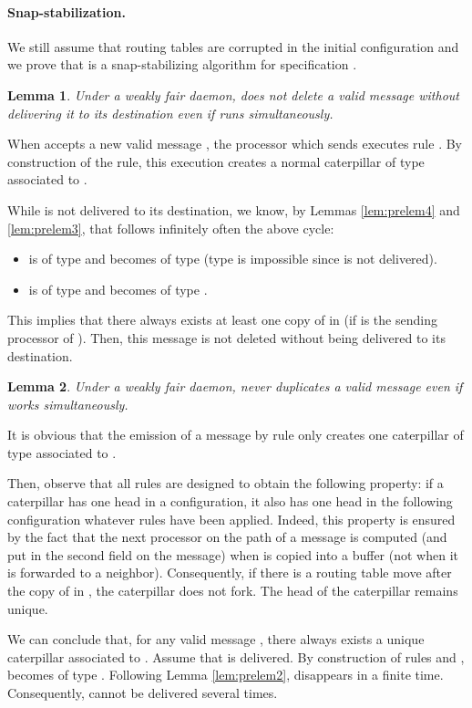 \documentclass[11pt]{article}
\newtheorem{lemma}{Lemma}
\newenvironment{proof}{{\noindent\bf Proof. } }{{\hfill }}
\begin{document}
\paragraph{Snap-stabilization.} We still assume that routing tables are corrupted in the initial configuration and we prove that \AD is a snap-stabilizing algorithm for specification .

\begin{lemma} \label{lem:perteD}
Under a weakly fair daemon, \AD does not delete a valid message without delivering it to its destination even if  runs simultaneously.
\end{lemma}

\begin{proof}
When \AD accepts a new valid message , the processor which sends  executes rule . By construction of the rule, this execution creates a normal caterpillar  of type  associated to .

While  is not delivered to its destination, we know, by Lemmas \ref{lem:prelem4} and \ref{lem:prelem3}, that  follows infinitely often the above cycle:

\begin{itemize}
\item  is of type  and becomes of type  (type  is impossible since  is not delivered).
\item  is of type  and becomes of type .
\end{itemize}

This implies that there always exists at least one copy of  in  (if  is the sending processor of ). Then, this message is not deleted without being delivered to its destination.
\end{proof}

\begin{lemma} \label{lem:duplicationD}
Under a weakly fair daemon, \AD never duplicates a valid message even if  works simultaneously.
\end{lemma}

\begin{proof}
It is obvious that the emission of a message  by rule  only creates one caterpillar of type  associated to . 

Then, observe that all rules are designed to obtain the following property: if a caterpillar has one head in a configuration, it also has one head in the following configuration whatever rules have been applied. Indeed, this property is ensured by the fact that the next processor on the path of a message  is computed (and put in the second field on the message) when  is copied into a buffer  (not when it is forwarded to a neighbor). Consequently, if there is a routing table move after the copy of  in , the caterpillar does not fork. The head of the caterpillar remains unique.

We can conclude that, for any valid message , there always exists a unique caterpillar  associated to . Assume that  is delivered. By construction of rules  and ,  becomes of type . Following Lemma \ref{lem:prelem2},  disappears in a finite time. Consequently,  cannot be delivered several times.
\end{proof}
\end{document}
